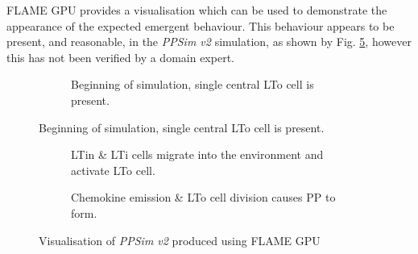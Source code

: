 \documentclass{UoYCSproject}
\begin{document}
\gls{FLAME GPU} provides a visualisation which can be used to demonstrate the appearance of the expected emergent behaviour.
This behaviour appears to be present, and reasonable, in the \textit{PPSim v2} simulation, as shown by Fig. \ref{fig:ppsimv2_vis}, however this has not been verified by a domain expert.

\begin{figure}[htpb]
\begin{subfigure}{\textwidth}
\centering
{}
\caption{Beginning of simulation, single central \gls{LTo} cell is present.}
\label{fig:sim_start}
\end{subfigure}
\end{figure}

\newpage

\begin{figure}[htpb]\ContinuedFloat
\begin{subfigure}{\textwidth}
\centering
{}
\caption{\gls{LTin} \& \gls{LTi} cells migrate into the environment and activate \gls{LTo} cell.}
\label{fig:sim_contact}
\end{subfigure}

\begin{subfigure}{\textwidth}
\centering
{}
\caption{Chemokine emission \& \gls{LTo} cell division causes \gls{PP} to form.}
\label{fig:sim_patch}
\end{subfigure}

\caption{Visualisation of \textit{PPSim v2} produced using \gls{FLAME GPU}}
\label{fig:ppsimv2_vis}
\end{figure}
\end{document}

